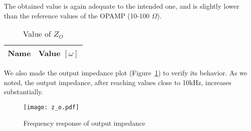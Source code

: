 The obtained value is again adequate to the intended one, and is slightly lower than the reference values of the OPAMP (10-100 $\Omega$).

\begin{table}[H]
  \centering
  \begin{tabular}{|l|r|}
    \hline    
    {\bf Name} & {\bf Value $[\omega]$ } \\ \hline
    
  \end{tabular}
  \caption{Value of $Z_O$}
  \label{tab:r}
\end{table}

We also made the output impedance plot (Figure~\ref{fig:zo}) to verify its behavior. As we noted, the output impedance, after reaching values close to 10kHz, increases substantially.

\vspace{-1.5in}
\begin{figure}[H] \centering
\texttt{[image: z\_o.pdf]}
\caption{Frequency response of output impedance}
\label{fig:zo}
\end{figure}

